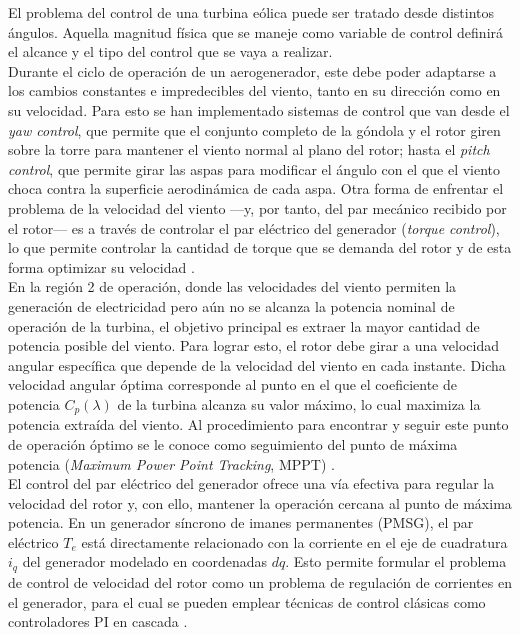 El problema del control de una turbina eólica puede ser tratado desde 
distintos ángulos. Aquella magnitud física que se maneje como variable de 
control definirá el alcance y el tipo del control que se vaya a realizar.
\\ 

Durante el ciclo de operación de un aerogenerador, este debe poder 
adaptarse a los cambios constantes e impredecibles del viento, tanto en su 
dirección como en su velocidad. Para esto se han implementado sistemas de 
control que van desde el \emph{yaw control}, que permite que el conjunto 
completo de la góndola y el rotor giren sobre la torre para mantener el 
viento normal al plano del rotor; hasta el \emph{pitch control}, que permite 
girar las aspas para modificar el ángulo con el que el viento choca contra 
la superficie aerodinámica de cada aspa. Otra forma de enfrentar el problema 
de la velocidad del viento ---y, por tanto, del par mecánico recibido por el 
rotor--- es a través de controlar el par eléctrico del generador 
(\emph{torque control}), lo que permite controlar la cantidad de torque que 
se demanda del rotor y de esta forma optimizar su velocidad \cite{Johnson2004}.
\\

En la región 2 de operación, donde las velocidades del viento permiten la 
generación de electricidad pero aún no se alcanza la potencia nominal de operación 
de la turbina, el objetivo principal es extraer la mayor cantidad de potencia 
posible del viento. Para lograr esto, el rotor debe girar a una velocidad 
angular específica que depende de la velocidad del viento en cada instante. 
Dicha velocidad angular óptima corresponde al punto en el que el coeficiente 
de potencia $C_p(\lambda)$ de la turbina alcanza su valor máximo, lo cual 
maximiza la potencia extraída del viento. Al procedimiento para 
encontrar y seguir este punto de operación óptimo se le conoce como 
seguimiento del punto de máxima potencia (\emph{Maximum Power Point 
Tracking}, MPPT) \cite{nak2013}.
\\

El control del par eléctrico del generador ofrece una vía efectiva para 
regular la velocidad del rotor y, con ello, mantener la operación cercana 
al punto de máxima potencia. En un generador síncrono de imanes permanentes 
(PMSG), el par eléctrico $T_e$ está directamente relacionado con la 
corriente en el eje de cuadratura $i_q$ del generador modelado en coordenadas $dq$. 
Esto permite formular el problema de control de velocidad del rotor como un 
problema de regulación de corrientes en el generador, para el cual se pueden 
emplear técnicas de control clásicas como controladores PI en cascada 
\cite{chinchilla2006, cisneros2020}.
\\


